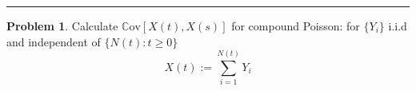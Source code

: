 \documentclass[a4paper, 10pt]{article}
\theoremstyle{definition}
\newtheorem{problem}{Problem}
\theoremstyle{hSol}
\begin{document}
\noindent\rule{16cm}{0.4pt}
\begin{problem} Calculate $\mathrm{\mathbb{C}ov}\left[X(t),X(s)\right]$ for compound Poisson: for $\{Y_i\}$ i.i.d and independent of $\{N(t):t\geq 0\}$
$$X(t):=\sum^{N(t)}_{i=1}Y_i$$ 
\end{problem}
\end{document}
